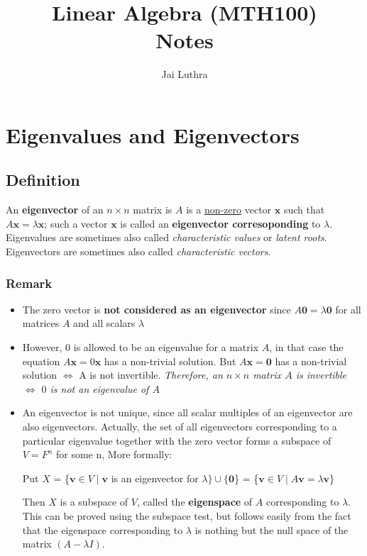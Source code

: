 \documentclass[twocolumn]{article}
\title{Linear Algebra (MTH100) \\ Notes}
\author{Jai Luthra}
\begin{document}
\maketitle

\section{Eigenvalues and Eigenvectors}

\subsection{Definition}

An \textbf{eigenvector} of an $n \times n$ matrix is $A$ is a \underline{non-zero} vector $\bm{x}$ such that $A\bm{x} = \lambda\bm{x}$; such a vector $\bm{x}$ is called an \textbf{eigenvector corresoponding} to $\lambda$.
Eigenvalues are sometimes also called \textit{characteristic values} or \textit{latent roots}. Eigenvectors are sometimes also called \textit{characteristic vectors}.

\subsubsection{Remark}

\begin{itemize}

\item The zero vector is \textbf{not considered as an eigenvector} since $A\bm{0} = \lambda \bm{0}$ for all matrices $A$ and all scalars $\lambda$

\item However, $0$ is allowed to be an eigenvalue for a matrix $A$, in that case the equation $A\bm{x} = 0\bm{x}$ has a non-trivial solution.
But $A\bm{x} = \bm{0}$ has a non-trivial solution $\bm{\Leftrightarrow}$ A is not invertible. \textit{Therefore, an $n \times n$ matrix $A$ is invertible $\Leftrightarrow$ $0$ is not an eigenvalue of $A$}

\item An eigenvector is not unique, since all scalar
multiples of an eigenvector are also eigenvectors.
Actually, the set of all eigenvectors corresponding to a
particular eigenvalue together with the zero vector forms a
subspace of $V = F^n$ for some n, More formally:

Put $X$ = \{$ \bm{v} \in V \mid \bm{v} $ is an eigenvector for $\lambda\} \cup \{\bm{0}$\} = \{$\bm{v} \in V \mid A \bm{v} = \lambda \bm{v}$\}

Then $X$ is a subspace of $V$, called the \textbf{eigenspace} of $A$
corresponding to $\lambda$. This can be proved using the subspace test, but follows easily from the fact that the eigenspace corresponding to $\lambda$ is nothing but the null space of the matrix $(A \mathbin{-} \lambda I)$.

\end{itemize}
\end{document}
